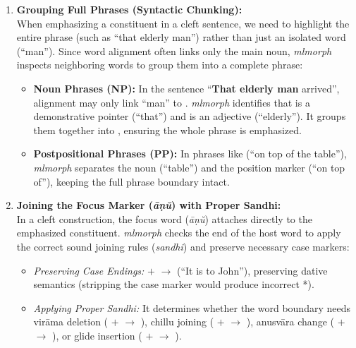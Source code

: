 \begin{enumerate}
    \item \textbf{Grouping Full Phrases (Syntactic Chunking):}\\
    When emphasizing a constituent in a cleft sentence, we need to highlight the entire phrase (such as ``that elderly man'') rather than just an isolated word (``man''). Since word alignment often links only the main noun, \textit{mlmorph} inspects neighboring words to group them into a complete phrase:
    \begin{itemize}[noitemsep]
        \item \textbf{Noun Phrases (NP):} In the sentence ``\textbf{That elderly man} arrived'', alignment may only link ``man'' to . \textit{mlmorph} identifies that  is a demonstrative pointer (``that'') and  is an adjective (``elderly''). It groups them together into , ensuring the whole phrase is emphasized.
        \item \textbf{Postpositional Phrases (PP):} In phrases like  (``on top of the table''), \textit{mlmorph} separates the noun  (``table'') and the position marker  (``on top of''), keeping the full phrase boundary intact.
    \end{itemize}

    \item \textbf{Joining the Focus Marker (\textit{āṇŭ}) with Proper Sandhi:}\\
    In a cleft construction, the focus word  (\textit{āṇŭ}) attaches directly to the emphasized constituent. \textit{mlmorph} checks the end of the host word to apply the correct sound joining rules (\textit{sandhi}) and preserve necessary case markers:
    \begin{itemize}[noitemsep]
        \item \textit{Preserving Case Endings:}  $+$  $\to$  (``It is to John''), preserving dative semantics (stripping the case marker would produce incorrect *).
        \item \textit{Applying Proper Sandhi:} It determines whether the word boundary needs virāma deletion ( $+$  $\to$ ), chillu joining ( $+$  $\to$ ), anusvāra change ( $+$  $\to$ ), or glide insertion ( $+$  $\to$ ).
    \end{itemize}


\end{enumerate}
